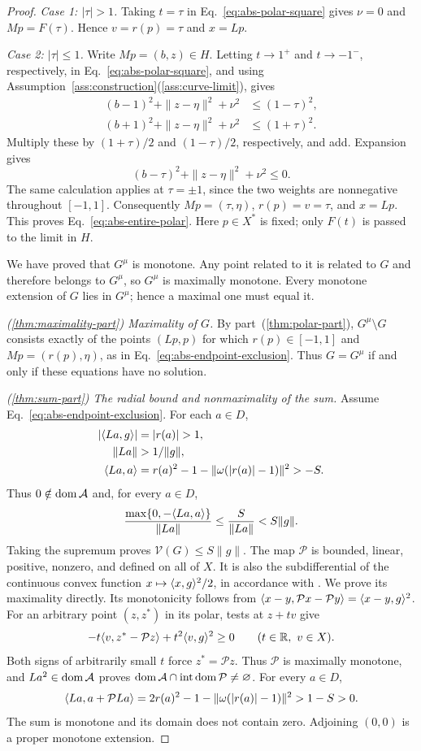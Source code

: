 \begin{proof}
\emph{Case 1: $|\tau|>1$.}
Taking $t=\tau$ in Eq.~\eqref{eq:abs-polar-square} gives
$\nu=0$ and $Mp=F(\tau)$. Hence $v=r(p)=\tau$ and $x=Lp$.

\emph{Case 2: $|\tau|\le1$.}
Write $Mp=(b,z)\in H$. Letting $t\to1^+$ and $t\to-1^-$,
respectively, in Eq.~\eqref{eq:abs-polar-square}, and using
Assumption~\ref{ass:construction}\textup{(\ref{ass:curve-limit})}, gives
\[
\begin{aligned}
(b-1)^2+\|z-\eta\|^2+\nu^2&\le(1-\tau)^2,\\
(b+1)^2+\|z-\eta\|^2+\nu^2&\le(1+\tau)^2.
\end{aligned}
\]
Multiply these by $(1+\tau)/2$ and $(1-\tau)/2$, respectively,
and add. Expansion gives
\[
(b-\tau)^2+\|z-\eta\|^2+\nu^2\le0.
\]
The same calculation applies at $\tau=\pm1$, since the two weights
are nonnegative throughout $[-1,1]$.
Consequently $Mp=(\tau,\eta)$, $r(p)=v=\tau$, and $x=Lp$.
This proves Eq.~\eqref{eq:abs-entire-polar}. Here $p\in X^*$ is fixed;
only $F(t)$ is passed to the limit in $H$.

We have proved that $G^\mu$ is monotone. Any point related to it
is related to $G$ and therefore belongs to $G^\mu$, so $G^\mu$
is maximally monotone. Every monotone extension of $G$ lies in
$G^\mu$; hence a maximal one must equal it.

\noindent\textit{\textup{(\ref{thm:maximality-part})} Maximality of $G$.}
By part~\textup{(\ref{thm:polar-part})}, $G^\mu\setminus G$ consists exactly of the points $(Lp,p)$ for which
$r(p)\in[-1,1]$ and $Mp=(r(p),\eta)$, as in
Eq.~\eqref{eq:abs-endpoint-exclusion}. Thus $G=G^\mu$ if and only if
these equations have no solution.

\noindent\textit{\textup{(\ref{thm:sum-part})} The radial bound and nonmaximality of the sum.}
Assume Eq.~\eqref{eq:abs-endpoint-exclusion}. For each $a\in D$,
\[
\begin{aligned}
|\pair{La}{g}|&=|r(a)|>1,\\
\|La\|&>1/\|g\|,\\
\pair{La}{a}&=r(a)^2-1-\|\omega(|r(a)|-1)\|^2>-S.
\end{aligned}
\]
Thus $0\notin\operatorname{dom}\mathcal A$ and, for every $a\in D$,
\[
\frac{\max\{0,-\langle La,a\rangle\}}{\|La\|}
\le\frac{S}{\|La\|}<S\|g\|.
\]
Taking the supremum proves $\mathcal V(G)\le S\|g\|$.
The map $\mathcal P$ is bounded, linear, positive, nonzero, and
defined on all of $X$. It is also the subdifferential of the continuous
convex function $x\mapsto\langle x,g\rangle^2/2$, in accordance with
\cite{rockafellar1970subdiff}. We prove its maximality directly.
Its monotonicity follows from
$\langle x-y,\mathcal Px-\mathcal Py\rangle=\langle x-y,g\rangle^2$.
For an arbitrary point $(z,z^*)$ in its polar, tests at $z+tv$ give
\[
-t\langle v,z^*-\mathcal Pz\rangle+t^2\langle v,g\rangle^2\ge0
\qquad(t\in\mathbb R,\ v\in X).
\]
Both signs of arbitrarily small $t$ force $z^*=\mathcal Pz$.
Thus $\mathcal P$ is maximally monotone, and $La^2\in\operatorname{dom}\mathcal A$
proves $\operatorname{dom}\mathcal A\cap\operatorname{int}\operatorname{dom}\mathcal P\ne\varnothing$.
For every $a\in D$,
\[
\langle La,a+\mathcal PLa\rangle
=2r(a)^2-1-\|\omega(|r(a)|-1)\|^2>1-S>0.
\]
The sum is monotone and its domain does not contain zero. Adjoining $(0,0)$
is a proper monotone extension.
\end{proof}

